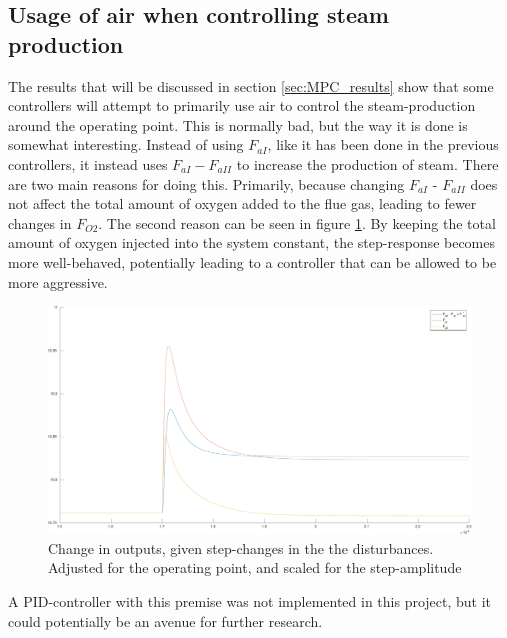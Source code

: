 \subsection{Usage of air when controlling steam production}

The results that will be discussed in section \ref{sec:MPC_results} show that some controllers will attempt to primarily use air to control the steam-production around the operating point. This is normally bad, but the way it is done is somewhat interesting. Instead of using $F_{aI}$, like it has been done in the previous controllers, it instead uses $F_{aI} -F_{aII}$ to increase the production of steam. There are two main reasons for doing this. Primarily, because changing $F_{aI}$ - $F_{aII}$  does not affect the total amount of oxygen added to the flue gas, leading to fewer changes in $F_{O2}$. The second reason can be seen in figure \ref{fig:F_diff_impulse_response}. By keeping the total amount of oxygen injected into the system constant, the step-response becomes more well-behaved, potentially leading to a controller that can be allowed to be more aggressive. 



\begin{figure}[!ht]
    \includegraphics[width=\textwidth]{img/compare_steam_from_air_inputs-eps-converted-to.pdf}
    \caption{Change in outputs, given step-changes in the the disturbances. Adjusted for the operating point, and scaled for the step-amplitude}
    \label{fig:F_diff_impulse_response}
\end{figure}

A PID-controller with this premise was not implemented in this project, but it could potentially be an avenue for further research. 
